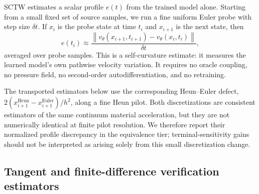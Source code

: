 SCTW estimates a scalar profile $e(t)$ from the trained model alone. Starting from a small fixed
set of source samples, we run a fine uniform Euler probe with step size $\delta t$. If $x_i$ is
the probe state at time $t_i$ and $x_{i+1}$ is the next state, then
\begin{equation}
  e(t_i)
  \approx
  \frac{
    \left\|
      v_\theta(x_{i+1},t_{i+1}) - v_\theta(x_i,t_i)
    \right\|
  }{\delta t},
  \label{eq:self-curvature-estimator}
\end{equation}
averaged over probe samples. This is a self-curvature estimate: it measures the learned model's
own pathwise velocity variation. It requires no oracle coupling, no pressure field, no
second-order autodifferentiation, and no retraining.

The transported estimators below use the corresponding Heun--Euler defect,
$2(x_{i+1}^{\mathrm{Heun}}-x_{i+1}^{\mathrm{Euler}})/h^2$, along a fine Heun pilot. Both
discretizations are consistent estimators of the same continuum material acceleration, but they
are not numerically identical at finite pilot resolution. We therefore report their normalized
profile discrepancy in the equivalence tier; terminal-sensitivity gains should not be interpreted
as arising solely from this small discretization change.

\subsection{Tangent and finite-difference verification estimators}
\label{sec:transport-estimators}

